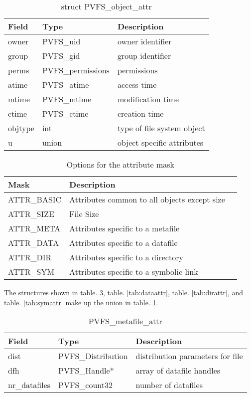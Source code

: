 \documentclass[11pt, letterpaper]{article}
\begin{document}
\begin{table}[H]
\begin{tabular}{|l|l|l|}
\hline
Field & Type & Description \\
\hline
\hline
owner & PVFS\_uid & owner identifier \\
\hline
group & PVFS\_gid & group identifier \\
\hline
perms & PVFS\_permissions & permissions \\
\hline
atime & PVFS\_atime & access time \\ 
\hline
mtime & PVFS\_mtime & modification time \\
\hline
ctime & PVFS\_ctime & creation time \\
\hline
objtype & int & type of file system object \\
\hline
u & union & object specific attributes \\
\hline
\end{tabular}
\caption{struct PVFS\_object\_attr}\label{tab:objattr}
\end{table}

\begin{table}[H]
\begin{tabular}{|l|l|l|}
\hline
Mask & Description \\
\hline
\hline
ATTR\_BASIC & Attributes common to all objects except size \\
\hline
ATTR\_SIZE & File Size \\
\hline
ATTR\_META & Attributes specific to a metafile \\
\hline
ATTR\_DATA & Attributes specific to a datafile \\
\hline
ATTR\_DIR & Attributes specific to a directory \\
\hline
ATTR\_SYM & Attributes specific to a symbolic link \\
\hline
\end{tabular}
\caption{Options for the attribute mask}\label{tab:optattr}
\end{table}


The structures shown in table. \ref{tab:metaattr}, table. \ref{tab:dataattr},
table. \ref{tab:dirattr}, and table. \ref{tab:symattr} make up the union in
table. \ref{tab:objattr}.

\begin{table}[H]
\begin{tabular}{|l|l|l|}
\hline
Field & Type & Description \\
\hline
\hline
dist & PVFS\_Distribution & distribution parameters for file \\
\hline
dfh & PVFS\_Handle* & array of datafile handles \\
\hline
nr\_datafiles & PVFS\_count32 & number of datafiles \\
\hline
\end{tabular}
\caption{PVFS\_metafile\_attr}\label{tab:metaattr}
\end{table}
\end{document}
